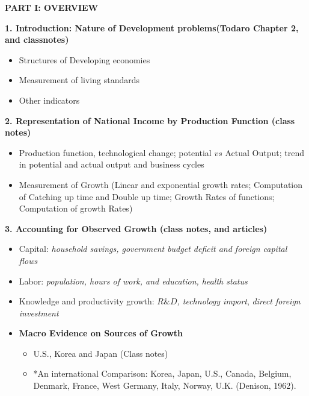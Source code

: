 \documentclass[11pt,pdftex]{article}
\begin{document}
\textbf{PART I: OVERVIEW}

\begin{description}
\item  \textbf{1. Introduction: Nature of Development problems(Todaro
Chapter 2, and classnotes)}

\begin{itemize}
\item  Structures of Developing economies

\item  Measurement of living standards

\item  Other indicators
\end{itemize}

\item  \textbf{2. Representation of National Income by Production Function
(class notes)}

\begin{itemize}
\item  Production function, technological change; potential $vs$ Actual
Output; trend in potential and actual output and business cycles

\item  Measurement of Growth (Linear and exponential growth rates;
Computation of Catching up time and Double up time; Growth Rates of
functions; Computation of growth Rates)
\end{itemize}

\item  \textbf{3. Accounting for Observed Growth (class notes, and articles)}

\begin{itemize}
\item  Capital: \emph{household savings, government budget deficit and
foreign capital flows }

\item  Labor: \emph{population, hours of work, and education, health status}

\item  Knowledge and productivity growth: $R\&D$\emph{, technology import}, 
\emph{direct foreign investment}

\item  \textbf{Macro Evidence on Sources of Growth}

\begin{itemize}
\item  U.S., Korea and Japan (Class notes)

\item  *An international Comparison: Korea, Japan, U.S., Canada, Belgium,
Denmark, France, West Germany, Italy, Norway, U.K. (Denison, 1962).
\end{itemize}
\end{itemize}


\end{description}
\end{document}
